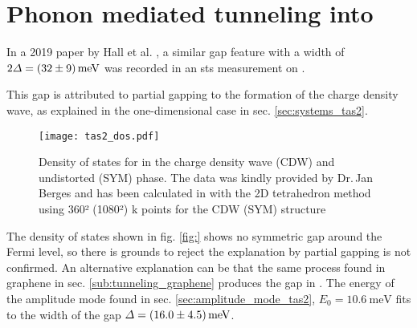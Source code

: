 \documentclass[main.tex]{subfiles}
\begin{document}
\clearpage
\section{Phonon mediated tunneling into \TaS}

In a 2019 paper by Hall et al. \cite{hall_environmental_2019}, a similar gap feature with a width of \(2 \Delta = \SI[separate-uncertainty = true]{32 \pm 9}{\milli\eV}\) was recorded in an \acrshort{sts} measurement on \TaS.

This gap is attributed to partial gapping to the formation of the charge density wave, as explained in the one-dimensional case in sec. \ref{sec:systems_tas2}.

\begin{figure}[htb!]
    \centering
    \texttt{[image: tas2\_dos.pdf]}
    \caption{Density of states for \TaS in the charge density wave (CDW) and undistorted (SYM) phase. The data was kindly provided by Dr.\,Jan Berges and has been calculated in \QE with the 2D tetrahedron method using 360² (1080²) k points for the CDW (SYM) structure}
    \label{fig:tas2_dos}
\end{figure}
The density of states shown in fig. \ref{fig:} shows no symmetric gap around the Fermi level, so there is grounds to reject the explanation by partial gapping is not confirmed.
An alternative explanation can be that the same process found in graphene in sec. \ref{sub:tunneling_graphene} produces the gap in \TaS.
The energy of the amplitude mode found in sec. \ref{sec:amplitude_mode_tas2}, \(E_0 = \SI{10.6}{\milli\eV}\) fits to the width of the gap \(\Delta = \SI[separate-uncertainty = true]{16 \pm 4.5}{\milli\eV}\).
\end{document}
